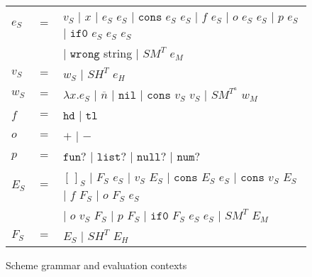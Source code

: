\begin{figure}[p]
\centering
\begin{tabular}{lcl}
\vspace{5pt}

$e_{S}$ & $=$ & $v_{S}$ $\vert$ $x$ $\vert$ $e_{S}$ $e_{S}$ $\vert$ $\mathtt{cons}$ $e_{S}$ $e_{S}$ $\vert$ $f$ $e_{S}$ $\vert$ $o$ $e_{S}$ $e_{S}$ $\vert$ $p$ $e_{S}$ $\vert$ $\mathtt{if0}$ $e_{S}$ $e_{S}$ $e_{S}$ \\

\vspace{5pt}

&& $\vert$ $\mathtt{wrong}$ string $\vert$ $SM^{T}$ $e_{M}$ \\

\vspace{5pt}

$v_{S}$ & $=$ & $w_{S}$ $\vert$ $SH^{T}$ $e_{H}$ \\

\vspace{5pt}

$w_{S}$ & $=$ & $\lambda x.e_{S}$ $\vert$ $\overline{n}$ $\vert$ $\mathtt{nil}$ $\vert$ $\mathtt{cons}$ $v_{S}$ $v_{S}$ $\vert$ $SM^{T^{a}}$ $w_{M}$ \\

\vspace{5pt}

$f$ & $=$ & $\mathtt{hd}$ $\vert$ $\mathtt{tl}$ \\

\vspace{5pt}

$o$ & $=$ & $+$ $\vert$ $-$ \\

\vspace{5pt}

$p$ & $=$ & $\mathtt{fun?}$ $\vert$ $\mathtt{list?}$ $\vert$ $\mathtt{null?}$ $\vert$ $\mathtt{num?}$ \\

\vspace{5pt}

$E_{S}$ & $=$ & $[\,]_{S}$ $\vert$ $F_{S}$ $e_{S}$ $\vert$ $v_{S}$ $E_{S}$ $\vert$ $\mathtt{cons}$ $E_{S}$ $e_{S}$ $\vert$ $\mathtt{cons}$ $v_{S}$ $E_{S}$ $\vert$ $f$ $F_{S}$ $\vert$ $o$ $F_{S}$ $e_{S}$ \\

\vspace{5pt}

&& $\vert$ $o$ $v_{S}$ $F_{S}$ $\vert$ $p$ $F_{S}$ $\vert$ $\mathtt{if0}$ $F_{S}$ $e_{S}$ $e_{S}$ $\vert$ $SM^{T}$ $E_{M}$ \\

\vspace{5pt}

$F_{S}$ & $=$ & $E_{S}$ $\vert$ $SH^{T}$ $E_{H}$
\end{tabular}
\caption{Scheme grammar and evaluation contexts}
\label{sg}
\end{figure}
